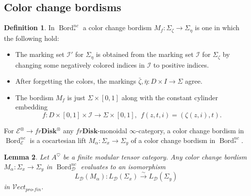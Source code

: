 \documentclass[reqno]{amsart}
\newtheorem{lemma}{Lemma}[section]
\theoremstyle{definition}
\newtheorem{definition}[lemma]{Definition}
\newcommand{\mcl}[1]{\mathcal{#1}}
\newcommand{\msc}[1]{\mathscr{#1}}
\newcommand{\ot}{\otimes}
\newcommand{\Vect}{\msc{V}\!ect}
\newcommand{\Disk}{\mathbf{Disk}}
\newcommand{\pf}{pro\text{-}fin}
\DeclareMathOperator{\Bord}{Bord}
\renewcommand{\1}{\mathbf{1}}
\begin{document}
\subsection{Color change bordisms}

\begin{definition}
In $\Bord_{\ast}^{nc}$ a color change bordism $M_f:\Sigma_{\zeta}\to \Sigma_{\eta}$ is one in which the following hold:
\begin{itemize}
\item The marking set $\mcl{I}'$ for $\Sigma_{\eta}$ is obtained from the marking set $\mcl{I}$ for $\Sigma_{\zeta}$ by changing some negatively colored indices in $\mcl{I}$ to positive indices.\vspace{1mm}
\item After forgetting the colors, the markings $\bar{\zeta},\bar{\eta}:D\times I\to\Sigma$ agree.\vspace{1mm}
\item The bordism $M_f$ is just $\Sigma\times [0,1]$ along with the constant cylinder embedding
\[
f:D\times[0,1]\times \mcl{I}\to \Sigma\times [0,1],\ \ f(z,t,i)=(\zeta(z,i),t).
\]
\end{itemize}
For $\msc{E}^{\ot}\to fr\Disk^{\ot}$ any $fr\Disk$-monoidal $\infty$-category, a color change bordism in $\Bord_{\msc{E}}^{nc}$ is a cocartesian lift $M_{\alpha}:\Sigma_x\to \Sigma_y$ of a color change bordism in $\Bord^{nc}_{\ast}$.
\end{definition}


\begin{lemma}\label{lem:color_change}
Let $A^{\heartsuit}$ be a finite modular tensor category.  Any color change bordism $M_{\alpha}:\Sigma_x\to \Sigma_y$ in $\Bord_{\msc{D}}^{nc}$ evaluates to an isomorphism
\[
L_{\msc{D}}(M_{\alpha}):L_{\msc{D}}(\Sigma_x)\overset{\sim}\to L_{\msc{D}}(\Sigma_y)
\]
in $\Vect_{\pf}$.
\end{lemma}
\end{document}
